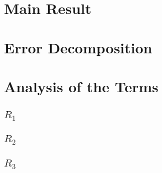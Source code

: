 \section{Main Result}
  
\section{Error Decomposition}
  
\section{Analysis of the Terms}
  \subsection{$R_1$}
    
  \subsection{$R_2$}
    
  \subsection{$R_3$}
    
